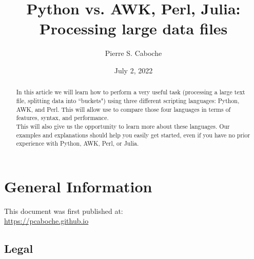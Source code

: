\documentclass[twoside]{article}
\title{Python vs. AWK, Perl, Julia: \\ Processing large data files}
\author{Pierre S. Caboche}
\date{
	July 2, 2022
}
\begin{document}
	
	\maketitle
	
	\begin{abstract}
		In this article we will learn how to perform a very useful task (processing a large text file, splitting data into ``buckets") using three different scripting languages: Python, AWK, and Perl.
		This will allow use to compare those four languages in terms of features, syntax, and performance. \\
		
		This will also give us the opportunity to learn more about these languages. Our examples and explanations should help you easily get started, even if you have no prior experience with Python, AWK, Perl, or Julia.
	\end{abstract}


\bigskip
\bigskip
\bigskip




\newpage
\section*{General Information}

This document was first published at: \\
\mbox{} \hfill \url{https://pcaboche.github.io} 

\subsection*{Legal}


\newpage
\renewcommand{\currentPart}{Table of Contents}

\setcounter{tocdepth}{3}
\tableofcontents

\newpage


\newpage


\newpage


\newpage


\newpage


\newpage


\newpage


\newpage


\newpage


\bigskip


\newpage
\renewcommand{\formatPartTitle}{}




\bigskip
\bigskip

\listoffigures
\listoftables


\label{LastPage}
\end{document}
